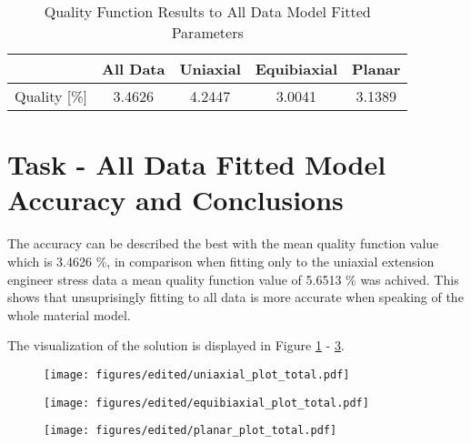 \documentclass[12pt]{article}
\begin{document}
\begin{table}[htbp]
  \centering
  \caption{Quality Function Results to All Data Model Fitted Parameters}
  \label{tab:quality_results_total}
  \begin{tabular}{ccccc}
      & \textbf{All Data} & \textbf{Uniaxial} & \textbf{Equibiaxial} & \textbf{Planar}\\[0.1 cm] \hline
      Quality [\%] & 3.4626 & 4.2447 & 3.0041 & 3.1389 
  \end{tabular}
\end{table}

\section{Task - All Data Fitted Model Accuracy and Conclusions}
The accuracy can be described the best with the mean quality function value which is 3.4626 \%, in comparison when fitting only to the uniaxial extension engineer stress data a mean quality function value of 5.6513 \% was achived. This shows that unsuprisingly fitting to all data is more accurate when speaking of the whole material model.
\medskip

The visualization of the solution is displayed in Figure \ref{fig:plot11} - \ref{fig:plot13}.

\begin{figure}[ht!]
  \begin{center}
  \texttt{[image: figures/edited/uniaxial\_plot\_total.pdf]}
  \label{fig:plot11}
  \end{center}
\end{figure}

\begin{figure}[ht!]
  \begin{center}
  \texttt{[image: figures/edited/equibiaxial\_plot\_total.pdf]}
  \label{fig:plot12}
  \end{center}
\end{figure}

\begin{figure}[ht!]
  \begin{center}
  \texttt{[image: figures/edited/planar\_plot\_total.pdf]}
  \label{fig:plot13}
  \end{center}
\end{figure}
\end{document}
